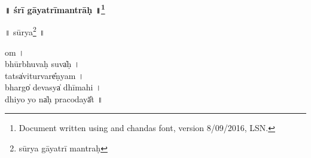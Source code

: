 \documentclass[parskip, DIV=14]{scrartcl}
\renewcommand{\thefootnote}{\fnsymbol{footnote}} %
\begin{document}

\vspace{-1.5cm}

\begin{center}
\textbf{{\Huge\vspace{0.201cm} ॥  śrī gā॒yatrīmantrāḥ॒ ॥\LARGE\let\thefootnote\relax\footnote{\color{lightgray} Document written using \XeLaTeX{} and chandas font, version 8/09/2016, LSN.}}}
\end{center}
\LARGE


\vspace{1.001cm} 

॥   sūrya\footnote{\color{lightgray} sūrya gāyatrī mantraḥ}  ॥\par
  om  । \\
  bhūrbhuva॒ḥ suva̍ḥ । \\
  tatsa̍vi॒turvare̎ṇyam । \\
  bhargo̍ de॒vasya̍ dhīmahi  । \\
  dhiyo॒ yo na̍ḥ praco॒dayā̎t ॥ \\
\end{document}
